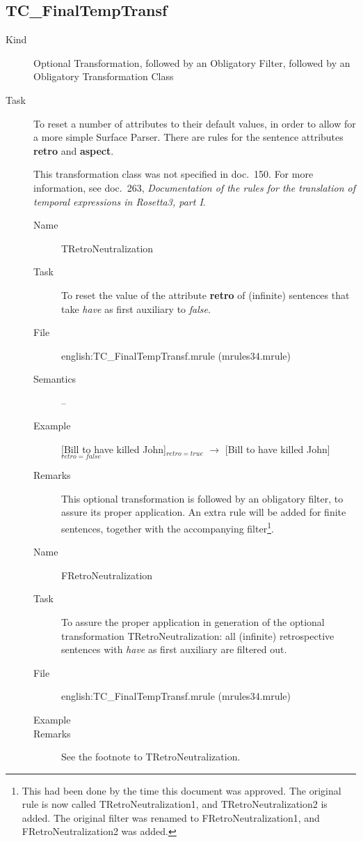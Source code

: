 \newpage
\subsection{TC\_FinalTempTransf}
\begin{description}
\item[Kind] Optional Transformation, followed by an Obligatory Filter, followed 
by an Obligatory Transformation Class
\item[Task] To reset a number of attributes to their default values, in order 
to allow for a more simple Surface Parser. There are rules for the sentence 
attributes {\bf retro} and {\bf aspect}.

This transformation class was 
not specified in doc.\ 150. For more information, see doc.\ 263, {\em 
Documentation of the rules for the translation of temporal expressions in 
Rosetta3, part I\/}.

\vspace{1 cm}
\begin{description}
\item[Name] TRetroNeutralization
\item[Task] To reset the value of the attribute {\bf retro} of (infinite) 
sentences that take {\em have\/} as first auxiliary to {\em false\/}.
\item[File] english:TC\_FinalTempTransf.mrule (mrules34.mrule)
\item[Semantics] --
\item[Example] [Bill to have killed John]$_{retro=true}$ 
$\rightarrow$ [Bill to have killed John]$_{retro=false}$
\item[Remarks] This optional transformation is followed by an obligatory 
filter, to assure its proper application. An extra rule will be added for 
finite sentences, together with the accompanying filter\footnote{This had been 
done by the time this document was approved. The original rule is now called 
TRetroNeutralization1, and TRetroNeutralization2 is added. The original filter 
was renamed to FRetroNeutralization1, and FRetroNeutralization2 was added.}.
\end{description}

\vspace{1 cm}
\begin{description}
\item[Name] FRetroNeutralization
\item[Task] To assure the proper application in generation of the optional 
transformation TRetroNeutralization: all (infinite) 
retrospective sentences with {\em have\/} as first auxiliary are filtered out.
\item[File] english:TC\_FinalTempTransf.mrule (mrules34.mrule)
\item[Example] 
\item[Remarks] See the footnote to TRetroNeutralization.
\end{description}


\end{description}
